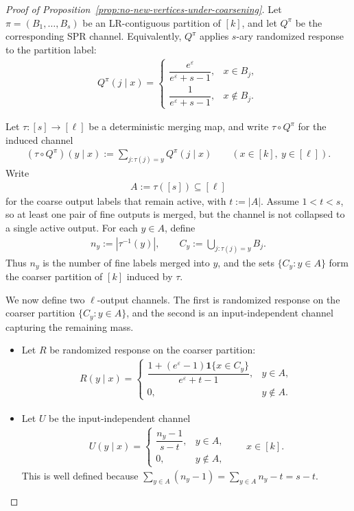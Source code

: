 \documentclass{article}
\theoremstyle{plain}
\theoremstyle{definition}
\theoremstyle{plain}
\newcommand{\eps}{\varepsilon}
\begin{document}
\begin{proof}[Proof of Proposition~\ref{prop:no-new-vertices-under-coarsening}]
Let $\pi=(B_1,\dots,B_s)$ be an LR-contiguous partition of $[k]$, and let $Q^\pi$ be the corresponding SPR channel. Equivalently, $Q^\pi$ applies $s$-ary randomized response to the partition label:
\begin{align*}
    Q^\pi(j\mid x)=
    \begin{cases}
    \dfrac{e^\eps}{e^\eps+s-1}, & x\in B_j,\\[6pt]
    \dfrac{1}{e^\eps+s-1}, & x\notin B_j.
    \end{cases}
\end{align*}

Let $\tau:[s]\to[\ell]$ be a deterministic merging map, and write $\tau\circ Q^\pi$ for the induced channel
\begin{align*}
    (\tau\circ Q^\pi)(y\mid x):=\sum_{j:\tau(j)=y} Q^\pi(j\mid x)
    \qquad (x\in[k],\ y\in[\ell]).
\end{align*}
Write
\begin{align*}
    A:=\tau([s])\subseteq [\ell]
\end{align*}
for the coarse output labels that remain active, with $t:=|A|$. Assume $1<t<s$, so at least one pair of fine outputs is merged, but the channel is not collapsed to a single active output. For each $y\in A$, define
\begin{align*}
    n_y:=|\tau^{-1}(y)|,
    \qquad
    C_y:=\bigcup_{j:\tau(j)=y} B_j.
\end{align*}
Thus $n_y$ is the number of fine labels merged into $y$, and the sets $\{C_y:y\in A\}$ form the coarser partition of $[k]$ induced by $\tau$.

We now define two $\ell$-output channels. The first is randomized response on the coarser partition $\{C_y:y\in A\}$, and the second is an input-independent channel capturing the remaining mass.
\begin{itemize}
    \item Let $R$ be randomized response on the coarser partition:
    \begin{align*}
    R(y\mid x)=
    \begin{cases}
        \dfrac{1+(e^\eps-1)\mathbf 1\{x\in C_y\}}{e^\eps+t-1}, & y\in A,\\[8pt]
        0, & y\notin A.
        \end{cases}
    \end{align*}

    \item Let $U$ be the input-independent channel
    \begin{align*}
    U(y\mid x)=
    \begin{cases}
        \dfrac{n_y-1}{s-t}, & y\in A,\\[8pt]
        0, & y\notin A,
        \end{cases}
        \qquad x\in [k].
    \end{align*}
    This is well defined because $\sum_{y\in A}(n_y-1)=\sum_{y\in A}n_y-t=s-t$.
\end{itemize}


\end{proof}
\end{document}
